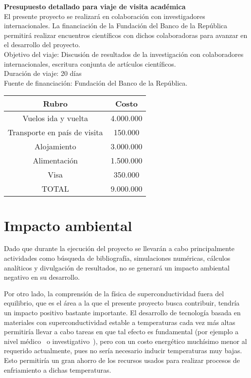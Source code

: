 \documentclass[a4paper,10pt]{article}
\begin{document}
\textbf{Presupuesto detallado para viaje de visita acad\'emica}\\

El presente proyecto se realizar\'a en colaboraci\'on con investigadores internacionales. La financiaci\'on de la Fundaci\'on del Banco de la Rep\'ublica permitir\'a realizar encuentros cient\'ificos con dichos colaboradoras para avanzar en el desarrollo del proyecto.\\

Objetivo del viaje: Discusi\'on de resultados de la investigaci\'on con colaboradores internacionales, escritura conjunta de art\'iculos cient\'ificos.\\
Duraci\'on de viaje: 20 d\'ias\\
Fuente de financiaci\'on: Fundaci\'on del Banco de la Rep\'ublica.\\

\begin{center}
\begin{tabular}{|c|c|}\hline
\textbf{Rubro} & \textbf{Costo}\\ \hline
Vuelos ida y vuelta & 4.000.000\\ \hline
Transporte en pa\'is de visita & 150.000\\ \hline
Alojamiento & 3.000.000\\ \hline
Alimentaci\'on & 1.500.000\\ \hline
Visa & 350.000\\ \hline
TOTAL & 9.000.000\\ \hline

\end{tabular}
\end{center}

\section{Impacto ambiental}
Dado que durante la ejecuci\'on del proyecto se llevar\'an a cabo principalmente actividades como b\'usqueda de bibliograf\'ia, simulaciones num\'ericas, c\'alculos anal\'iticos y divulgaci\'on de resultados, no se generar\'a un impacto ambiental negativo en su desarrollo. 

Por otro lado, la comprensi\'on de la f\'isica de superconductividad fuera del equilibrio, que es el \'area a la que el presente proyecto busca contribuir, tendr\'ia un impacto positivo bastante importante. El desarrollo de tecnolog\'ia basada en materiales con superconductividad estable a temperaturas cada vez m\'as altas permitir\'ia llevar a cabo tareas en que tal efecto es fundamental (por ejemplo a nivel m\'edico~\cite{aarnink2012euro} o investigativo~\cite{bottura2016ieee}), pero con un costo energ\'etico much\'isimo menor al requerido actualmente, pues no ser\'ia necesario inducir temperaturas muy bajas. Esto permitir\'ia un gran ahorro de los recursos usados para realizar procesos de enfriamiento a dichas temperaturas.
\end{document}
